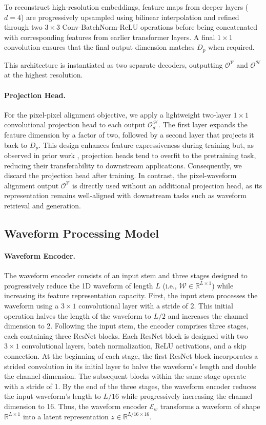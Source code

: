 To reconstruct high-resolution embeddings, feature maps from deeper layers ($d=4$) are progressively upsampled using bilinear interpolation and refined through two $3 \times 3$ Conv-BatchNorm-ReLU operations before being concatenated with corresponding features from earlier transformer layers. A final $1 \times 1$ convolution ensures that the final output dimension matches $D_p$ when required.

This architecture is instantiated as two separate decoders, outputting $\mathcal{O}^\mathcal{V}$ and $\mathcal{O}^\mathcal{H}$ at the highest resolution.

\paragraph{Projection Head.} For the pixel-pixel alignment objective, we apply a lightweight two-layer $1 \times 1$ convolutional projection head to each output $\mathcal{O}^\mathcal{H}_d$. The first layer expands the feature dimension by a factor of two, followed by a second layer that projects it back to $D_p$. This design enhances feature expressiveness during training but, as observed in prior work \cite{xue2024projectionhead}, projection heads tend to overfit to the pretraining task, reducing their transferability to downstream applications. Consequently, we discard the projection head after training. In contrast, the pixel-waveform alignment output $\mathcal{O}^\mathcal{V}$ is directly used without an additional projection head, as its representation remains well-aligned with downstream tasks such as waveform retrieval and generation.

\subsection{Waveform Processing Model}
\paragraph{Waveform Encoder.} The waveform encoder consists of an input stem and three stages designed to progressively reduce the 1D waveform of length $L$ (i.e., $\mathcal{W} \in \mathbb{R}^{L \times 1}$) while increasing its feature representation capacity. First, the input stem processes the waveform using a $3 \times 1$ convolutional layer with a stride of 2. This initial operation halves the length of the waveform to \( L/2 \) and increases the channel dimension to 2. Following the input stem, the encoder comprises three stages, each containing three ResNet blocks. Each ResNet block is designed with two $3 \times 1$ convolutional layers, batch normalization, ReLU activations, and a skip connection. At the beginning of each stage, the first ResNet block incorporates a strided convolution in its initial layer to halve the waveform’s length and double the channel dimension. The subsequent blocks within the same stage operate with a stride of 1. By the end of the three stages, the waveform encoder reduces the input waveform’s length to \( L/16 \) while progressively increasing the channel dimension to 16. Thus, the waveform encoder $\mathcal{E}_w$ transforms a waveform of shape $\mathbb{R}^{L \times 1}$ into a latent representation $z \in \mathbb{R}^{L/16 \times 16}$.

